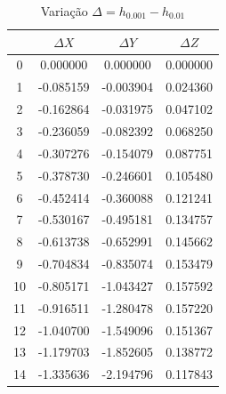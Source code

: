 \documentclass[12pt, a4paper]{article}
\begin{document}
\begin{table}[H]
    \centering
    \footnotesize %
    \begin{tabular}{|c|c|c|c|}
    \toprule
    & $\Delta X$ & $\Delta Y$ & $\Delta Z$ \\
    \midrule
    0 & 0.000000 & 0.000000 & 0.000000 \\
    1 & -0.085159 & -0.003904 & 0.024360 \\
    2 & -0.162864 & -0.031975 & 0.047102 \\
    3 & -0.236059 & -0.082392 & 0.068250 \\
    4 & -0.307276 & -0.154079 & 0.087751 \\
    5 & -0.378730 & -0.246601 & 0.105480 \\
    6 & -0.452414 & -0.360088 & 0.121241 \\
    7 & -0.530167 & -0.495181 & 0.134757 \\
    8 & -0.613738 & -0.652991 & 0.145662 \\
    9 & -0.704834 & -0.835074 & 0.153479 \\
    10 & -0.805171 & -1.043427 & 0.157592 \\
    11 & -0.916511 & -1.280478 & 0.157220 \\
    12 & -1.040700 & -1.549096 & 0.151367 \\
    13 & -1.179703 & -1.852605 & 0.138772 \\
    14 & -1.335636 & -2.194796 & 0.117843 \\
    \bottomrule
    \end{tabular}
    \caption{Variação $\Delta = h_{0.001} - h_{0.01}$}
\end{table}
\end{document}
